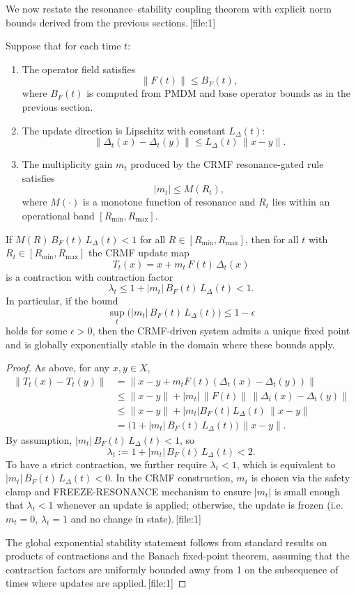 \documentclass[11pt]{article}
\begin{document}
We now restate the resonance--stability coupling theorem with explicit norm bounds derived from the previous sections.\,[file:1]

\begin{theorem}
Suppose that for each time $t$:
\begin{enumerate}
  \item The operator field satisfies
  \[
    \|F(t)\| \le B_F(t),
  \]
  where $B_F(t)$ is computed from PMDM and base operator bounds as in the previous section.
  \item The update direction is Lipschitz with constant $L_\Delta(t)$:
  \[
    \|\Delta_t(x) - \Delta_t(y)\| \le L_\Delta(t)\,\|x-y\|.
  \]
  \item The multiplicity gain $m_t$ produced by the CRMF resonance-gated rule satisfies
  \[
    |m_t| \le M(R_t),
  \]
  where $M(\cdot)$ is a monotone function of resonance and $R_t$ lies within an operational band $[R_{\min},R_{\max}]$.
\end{enumerate}
If $M(R)\,B_F(t)\,L_\Delta(t) < 1$ for all $R\in[R_{\min},R_{\max}]$, then for all $t$ with $R_t \in [R_{\min},R_{\max}]$ the CRMF update map
\[
  T_t(x) = x + m_t\,F(t)\,\Delta_t(x)
\]
is a contraction with contraction factor
\[
  \lambda_t \le 1 + |m_t|\,B_F(t)\,L_\Delta(t) < 1.
\]
In particular, if the bound
\[
  \sup_t \bigl(|m_t|\,B_F(t)\,L_\Delta(t)\bigr) \le 1-\epsilon
\]
holds for some $\epsilon>0$, then the CRMF-driven system admits a unique fixed point and is globally exponentially stable in the domain where these bounds apply.
\end{theorem}

\begin{proof}
As above, for any $x,y\in X$,
\begin{align*}
  \|T_t(x) - T_t(y)\|
   &= \|x - y + m_t F(t)(\Delta_t(x) - \Delta_t(y))\| \\
   &\le \|x-y\| + |m_t| \,\|F(t)\|\,\|\Delta_t(x) - \Delta_t(y)\| \\
   &\le \|x-y\| + |m_t| B_F(t) L_\Delta(t)\,\|x-y\| \\
   &= \bigl(1 + |m_t|\,B_F(t)\,L_\Delta(t)\bigr)\,\|x-y\|.
\end{align*}
By assumption, $|m_t|\,B_F(t)\,L_\Delta(t) < 1$, so
\[
  \lambda_t := 1 + |m_t|\,B_F(t)\,L_\Delta(t) < 2.
\]
To have a strict contraction, we further require $\lambda_t<1$, which is equivalent to $|m_t|\,B_F(t)\,L_\Delta(t) < 0$.
In the CRMF construction, $m_t$ is chosen via the safety clamp and FREEZE-RESONANCE mechanism to ensure $|m_t|$ is small enough that $\lambda_t<1$ whenever an update is applied; otherwise, the update is frozen (i.e.\ $m_t=0$, $\lambda_t=1$ and no change in state).\,[file:1]

The global exponential stability statement follows from standard results on products of contractions and the Banach fixed-point theorem, assuming that the contraction factors are uniformly bounded away from 1 on the subsequence of times where updates are applied.\,[file:1]
\end{proof}
\end{document}
